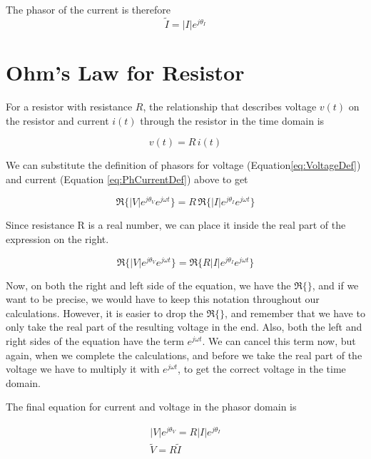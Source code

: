 \documentclass{ximera}
\begin{document}
The phasor of the current is therefore
\begin{equation}
\tilde{I}=|I|e^{j\theta_{I}}
\end{equation}



\section{Ohm's Law for Resistor}

For a  resistor with resistance $R$, the relationship that describes voltage $v(t)$ on the resistor and  current $i(t)$ through the resistor in the time domain is

\begin{equation}
v(t)=R \, i(t)
\end{equation}

We can substitute the definition of phasors for voltage (Equation\ref{eq:VoltageDef}) and current (Equation \ref{eq:PhCurrentDef})  above to get

\begin{equation}
 \Re\{|V|e^{j\theta_{V}} e^{j \omega t}\}   = R \, \Re\{|I|e^{j\theta_{I}} e^{j \omega t}\}
\end{equation}

Since resistance R is a real number, we can place it inside the real part of the expression on the right.

\begin{equation}
 \Re\{|V|e^{j\theta_{V}} e^{j \omega t}\}   =   \Re\{ R |I|e^{j\theta_{I}} e^{j \omega t}\}
\end{equation}

Now, on both the right and left side of the equation, we have the $\Re\{\}$, and if we want to be precise, we would have to keep this notation throughout our calculations. However, it is easier to drop the $\Re\{\}$, and remember that we have to only take the real part of the resulting voltage in the end. Also, both the left and right sides of the equation have the term $e^{j \omega t}$. We can cancel this term now, but again, when we complete the calculations, and before we take the real part of the voltage we have to multiply it with $e^{j \omega t}$, to get the correct voltage in the time domain.

The final equation for current and voltage in the phasor domain is

\begin{eqnarray}
|V|e^{j\theta_{V}}    =  R |I|e^{j\theta_{I}}  \\
\tilde{V} = R \tilde{I}
\end{eqnarray}
\end{document}
